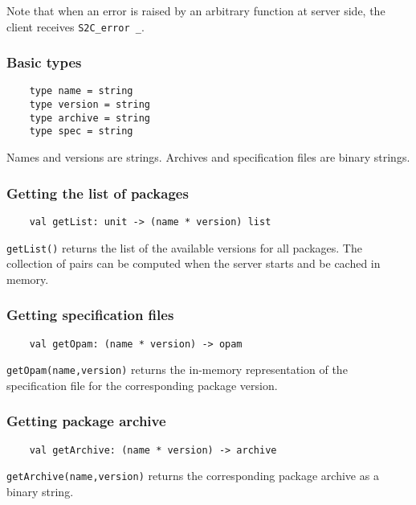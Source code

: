 \documentclass[a4paper,11pt]{article}
\begin{document}
Note that when an error is raised by an arbitrary function
 at server side, the client receives \verb|S2C_error _|.

\subsubsection{Basic types}

\begin{verbatim}
    type name = string
    type version = string
    type archive = string
    type spec = string
\end{verbatim}

Names and versions are strings. Archives and specification files are
binary strings.

\subsubsection{Getting the list of packages}
\label{getList}

\begin{verbatim}
    val getList: unit -> (name * version) list
\end{verbatim}

{\tt getList()} returns the list of the available versions for all
packages. The collection of pairs can be computed when the server
starts and be cached in memory.

\subsubsection{Getting specification files}
\label{getOpam}

\begin{verbatim}
    val getOpam: (name * version) -> opam
\end{verbatim}

{\tt getOpam(name,version)} returns the in-memory representation of
the specification file for the corresponding package version.

\subsubsection{Getting package archive}
\label{getArchive}

\begin{verbatim}
    val getArchive: (name * version) -> archive
\end{verbatim}

{\tt getArchive(name,version)} returns the corresponding package
archive as a binary string.
\end{document}
